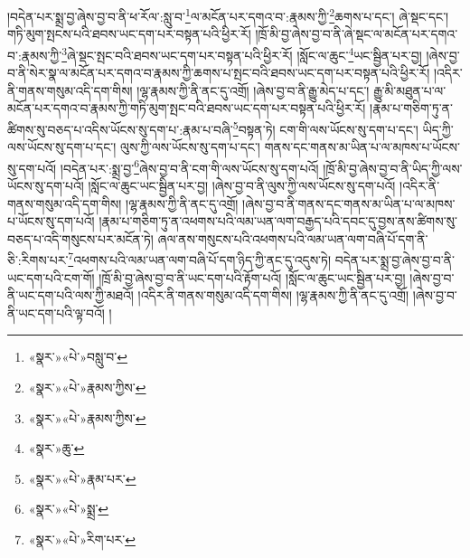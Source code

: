 །བདེན་པར་སྨྲ་བྱ་ཞེས་བྱ་བ་ནི་ཕ་རོལ་:སླུ་བ་\footnote{«སྣར་»«པེ་»བསླུ་བ་}ལ་མངོན་པར་དགའ་བ་:རྣམས་ཀྱི་\footnote{«སྣར་»«པེ་»རྣམས་ཀྱིས་}ཆགས་པ་དང་། ཞེ་སྡང་དང་། གཏི་མུག་སྤངས་པའི་ཐབས་ཡང་དག་པར་བསྟན་པའི་ཕྱིར་རོ། །ཁྲོ་མི་བྱ་ཞེས་བྱ་བ་ནི་ཞེ་སྡང་ལ་མངོན་པར་དགའ་བ་:རྣམས་ཀྱི་\footnote{«སྣར་»«པེ་»རྣམས་ཀྱིས་}ཞེ་སྡང་སྤང་བའི་ཐབས་ཡང་དག་པར་བསྟན་པའི་ཕྱིར་རོ། །སློང་ལ་ཆུང་\footnote{«སྣར་»ཆུ་}ཡང་སྦྱིན་པར་བྱ། །ཞེས་བྱ་བ་ནི་སེར་སྣ་ལ་མངོན་པར་དགའ་བ་རྣམས་ཀྱི་ཆགས་པ་སྤང་བའི་ཐབས་ཡང་དག་པར་བསྟན་པའི་ཕྱིར་རོ། །འདིར་ནི་གནས་གསུམ་འདི་དག་གིས། །ལྷ་རྣམས་ཀྱི་ནི་ནང་དུ་འགྲོ། །ཞེས་བྱ་བ་ནི་རྒྱུ་མེད་པ་དང་། རྒྱུ་མི་མཐུན་པ་ལ་མངོན་པར་དགའ་བ་རྣམས་ཀྱི་གཏི་མུག་སྤང་བའི་ཐབས་ཡང་དག་པར་བསྟན་པའི་ཕྱིར་རོ། །རྣམ་པ་གཅིག་ཏུ་ན་ཚིགས་སུ་བཅད་པ་འདིས་ཡོངས་སུ་དག་པ་:རྣམ་པ་བཞི་\footnote{«སྣར་»«པེ་»རྣམ་པར་}བསྟན་ཏེ། ངག་གི་ལས་ཡོངས་སུ་དག་པ་དང་། ཡིད་ཀྱི་ལས་ཡོངས་སུ་དག་པ་དང་། ལུས་ཀྱི་ལས་ཡོངས་སུ་དག་པ་དང་། གནས་དང་གནས་མ་ཡིན་པ་ལ་མཁས་པ་ཡོངས་སུ་དག་པའོ། །བདེན་པར་:སྨྲ་བྱ་\footnote{«སྣར་»«པེ་»སྨྲ་}ཞེས་བྱ་བ་ནི་ངག་གི་ལས་ཡོངས་སུ་དག་པའོ། །ཁྲོ་མི་བྱ་ཞེས་བྱ་བ་ནི་ཡིད་ཀྱི་ལས་ཡོངས་སུ་དག་པའོ། །སློང་ལ་ཆུང་ཡང་སྦྱིན་པར་བྱ། །ཞེས་བྱ་བ་ནི་ལུས་ཀྱི་ལས་ཡོངས་སུ་དག་པའོ། །འདིར་ནི་གནས་གསུམ་འདི་དག་གིས། །ལྷ་རྣམས་ཀྱི་ནི་ནང་དུ་འགྲོ། །ཞེས་བྱ་བ་ནི་གནས་དང་གནས་མ་ཡིན་པ་ལ་མཁས་པ་ཡོངས་སུ་དག་པའོ། །རྣམ་པ་གཅིག་ཏུ་ན་འཕགས་པའི་ལམ་ཡན་ལག་བརྒྱད་པའི་དབང་དུ་བྱས་ནས་ཚིགས་སུ་བཅད་པ་འདི་གསུངས་པར་མངོན་ཏེ། ཞལ་ནས་གསུངས་པའི་འཕགས་པའི་ལམ་ཡན་ལག་བཞི་པོ་དག་ནི་ཅི་:རིགས་པར་\footnote{«སྣར་»«པེ་»རིག་པར་}འཕགས་པའི་ལམ་ཡན་ལག་བཞི་པོ་དག་ཉིད་ཀྱི་ནང་དུ་འདུས་ཏེ། བདེན་པར་སྨྲ་བྱ་ཞེས་བྱ་བ་ནི་ཡང་དག་པའི་ངག་གོ། །ཁྲོ་མི་བྱ་ཞེས་བྱ་བ་ནི་ཡང་དག་པའི་རྟོག་པའོ། །སློང་ལ་ཆུང་ཡང་སྦྱིན་པར་བྱ། །ཞེས་བྱ་བ་ནི་ཡང་དག་པའི་ལས་ཀྱི་མཐའོ། །འདིར་ནི་གནས་གསུམ་འདི་དག་གིས། །ལྷ་རྣམས་ཀྱི་ནི་ནང་དུ་འགྲོ། །ཞེས་བྱ་བ་ནི་ཡང་དག་པའི་ལྟ་བའོ། །
